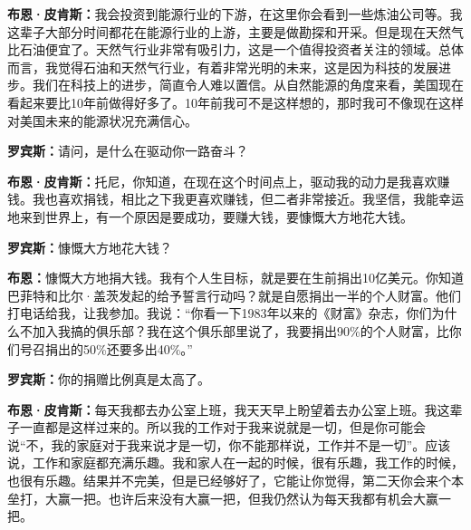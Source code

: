 \begin{BookQuote}
\textbf{布恩·皮肯斯：}我会投资到能源行业的下游，在这里你会看到一些炼油公司等。我这辈子大部分时间都花在能源行业的上游，主要是做勘探和开采。但是现在天然气比石油便宜了。天然气行业非常有吸引力，这是一个值得投资者关注的领域。总体而言，我觉得石油和天然气行业，有着非常光明的未来，这是因为科技的发展进步。我们在科技上的进步，简直令人难以置信。从自然能源的角度来看，美国现在看起来要比10年前做得好多了。10年前我可不是这样想的，那时我可不像现在这样对美国未来的能源状况充满信心。
\end{BookQuote}

\begin{BookQuote}
\textbf{罗宾斯：}请问，是什么在驱动你一路奋斗？
\end{BookQuote}

\begin{BookQuote}
\textbf{布恩·皮肯斯：}托尼，你知道，在现在这个时间点上，驱动我的动力是我喜欢赚钱。我也喜欢捐钱，相比之下我更喜欢赚钱，但二者非常接近。我坚信，我能幸运地来到世界上，有一个原因是要成功，要赚大钱，要慷慨大方地花大钱。
\end{BookQuote}

\begin{BookQuote}
\textbf{罗宾斯：}慷慨大方地花大钱？
\end{BookQuote}

\begin{BookQuote}
\textbf{布恩：}慷慨大方地捐大钱。我有个人生目标，就是要在生前捐出10亿美元。你知道巴菲特和比尔·盖茨发起的给予誓言行动吗？就是自愿捐出一半的个人财富。他们打电话给我，让我参加。我说：“你看一下1983年以来的《财富》杂志，你们为什么不加入我搞的俱乐部？我在这个俱乐部里说了，我要捐出90\%的个人财富，比你们号召捐出的50\%还要多出40\%。”
\end{BookQuote}

\begin{BookQuote}
\textbf{罗宾斯：}你的捐赠比例真是太高了。
\end{BookQuote}

\begin{BookQuote}
\textbf{布恩·皮肯斯：}每天我都去办公室上班，我天天早上盼望着去办公室上班。我这辈子一直都是这样过来的。所以我的工作对于我来说就是一切，但是你可能会说“不，我的家庭对于我来说才是一切，你不能那样说，工作并不是一切”。应该说，工作和家庭都充满乐趣。我和家人在一起的时候，很有乐趣，我工作的时候，也很有乐趣。结果并不完美，但是已经够好了，它能让你觉得，第二天你会来个本垒打，大赢一把。也许后来没有大赢一把，但我仍然认为每天我都有机会大赢一把。
\end{BookQuote}


